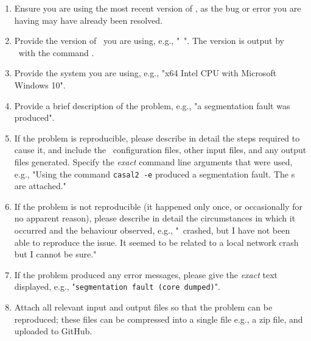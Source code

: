 \begin{enumerate}
\item Ensure you are using the most recent version of \CNAME, as the bug or error you are having may have already been resolved.
\item Provide the version of \CNAME\ you are using, e.g., "\CNAME\ \VER". The version is output by \CNAME\ with the command .
\item Provide the system  you are using, e.g., "x64 Intel CPU with Microsoft Windows 10".
\item Provide a brief description of the problem, e.g., "a segmentation fault was produced".
\item If the problem is reproducible, please describe in detail the steps required to cause it, and include the \CNAME\ configuration files, other input files, and any output files generated. Specify the \emph{exact} command line arguments that were used, e.g., "Using the command \texttt{casal2 -e} produced a segmentation fault. The \config s are attached."
\item If the problem is not reproducible (it happened only once, or occasionally for no apparent reason), please describe in detail the circumstances in which it occurred and the behaviour observed, e.g., "\CNAME\ crashed, but I have not been able to reproduce the issue. It seemed to be related to a local network crash but I cannot be sure."
\item If the problem produced any error messages, please give the \emph{exact} text displayed, e.g., "\texttt{segmentation fault (core dumped)}".
\item Attach all relevant input and output files so that the problem can be reproduced; these files can be compressed into a single file e.g., a zip file, and uploaded to GitHub.
\end{enumerate}
